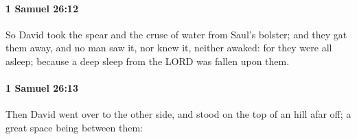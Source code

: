 		\paragraph{1 Samuel 26:12} %
			\label{1SAMUEL-26-12}

			So David took the spear and the cruse of water from Saul’s bolster; and they gat them away, and no man saw it, nor knew it, neither awaked: for they were all asleep; because a deep sleep from the LORD was fallen upon them.


		\paragraph{1 Samuel 26:13} %
			\label{1SAMUEL-26-13}

			Then David went over to the other side, and stood on the top of an hill afar off; a great space being between them:


